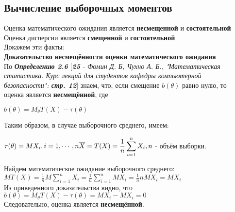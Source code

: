 \documentclass[14pt,a4paper,oneside]{extbook}
\begin{document}
    \subsection{Вычисление выборочных моментов}
    Оценка математического ожидания является \textbf{несмещенной} и \textbf{состоятельной}\\
    Оценка дисперсии является \textbf{смещенной} и \textbf{состоятельной}\\
    Докажем эти факты: \\
    \textbf{Доказательство несмещённости оценки математического ожидания} \\
    По \textit{\textbf{Определению 2.6}} [\textit{\textbf{25} - Фомин Д. Б, Чухно А. Б., "Математическая статистика. Курс лекций для студентов кафедры компьютерной безопасности": \textbf{стр. 12}}] знаем, что, если смещение $b(\theta)$ равно нулю, то оценка является \textbf{несмещённой}, где
    \begin{center}
        $\displaystyle b(\theta) = M_{\theta}T(X) - \tau(\theta)$
    \end{center}
    Таким образом, в случае выборочного среднего, имеем:
    \begin{center}
        $\displaystyle \tau(\theta) = MX_{i}, i = 1,\cdots,n \\
        \displaystyle \overline{X} = T(X) = \frac{1}{n}\sum_{i=1}^{n}X_{i}, n$ - объём выборки. 
    \end{center}
    Найдем математическое ожидание выборочного среднего: \\
    $\displaystyle MT(X) = \frac{1}{n}M\sum_{i=1}^{n}X_{i} = \frac{1}{n}\sum_{i=1}^{n}M X_{i} = \frac{1}{n}nMX_{i} = MX_{i}$ \\
    Из приведенного доказательства видно, что \\
    $\displaystyle b(\theta) = M_{\theta}T(X) - \tau(\theta) = MX_{i} - MX_{i} = 0$\\
    Следовательно, оценка является \textbf{несмещённой}.\\
    
\end{document}
